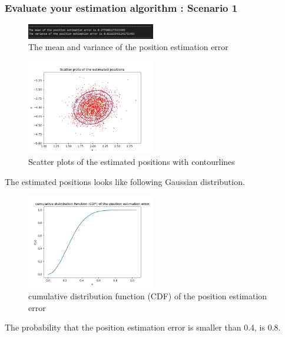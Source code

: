\documentclass[a4paper]{article}
\begin{document}
\subsubsection{Evaluate your estimation algorithm : Scenario 1}
\begin{figure}[h]
	\begin{center}
		\includegraphics[width=0.5\textwidth]{mean_variance_error1.jpg}
		\caption{The mean and variance of the position estimation error}
	\end{center}
\end{figure}
\begin{figure}[h]
	\begin{center}
		\includegraphics[width=0.5\textwidth]{plotcon1.png}
		\caption{Scatter plots of the estimated positions with contourlines}
	\end{center}
\end{figure}
The estimated positions looks like following Gaussian distribution.
\begin{figure}[h]
	\begin{center}		
		\includegraphics[width=0.5\textwidth]{CDF1.png}
		\caption{cumulative distribution function (CDF) of the position estimation error}
	\end{center}
\end{figure}

The probability that the position estimation error is smaller than 0.4, is 0.8.
\end{document}
